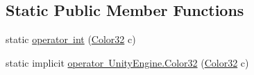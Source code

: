 \subsection*{Static Public Member Functions}
\begin{DoxyCompactItemize}
\item 
static \mbox{\hyperlink{struct_virt_muse_web_1_1_utility_1_1_image_1_1_color32_a331a16a6c1ff2d93f74c5b62c2ade2b6}{operator int}} (\mbox{\hyperlink{struct_virt_muse_web_1_1_utility_1_1_image_1_1_color32}{Color32}} c)
\item 
static implicit \mbox{\hyperlink{struct_virt_muse_web_1_1_utility_1_1_image_1_1_color32_aa2463b9dc8e771821f4c47f4d2a11cc8}{operator Unity\+Engine.\+Color32}} (\mbox{\hyperlink{struct_virt_muse_web_1_1_utility_1_1_image_1_1_color32}{Color32}} c)
\end{DoxyCompactItemize}
